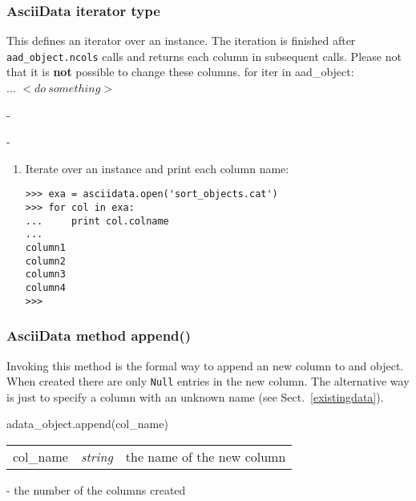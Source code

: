 \subsubsection{AsciiData iterator type}
\label{adm_iterator}
%
This defines an iterator over an \ad instance. The iteration is finished after
{\tt aad\_object.ncols} calls and returns each column in subsequent calls.
Please not that it is {\bf not} possible to change these columns.
for iter in aad\_object:\\
... $<do\ something>$

-

-

\begin{enumerate}
\item Iterate over an \ad instance and print each column name:
\begin{small}
\begin{verbatim}
>>> exa = asciidata.open('sort_objects.cat')
>>> for col in exa:
...     print col.colname
...
column1
column2
column3
column4
>>>
\end{verbatim}
\end{small}
\end{enumerate}


\subsubsection{AsciiData method append()}
\label{adm_append}
Invoking this method is the formal way to append an new column
to and \ad object. When created there are only {\tt Null} entries in the
new column. The alternative way is just to specify a column
with an unknown name (see Sect.\ \ref{existingdata}).

adata\_object.append(col\_name)

\begin{tabular}{lcl}
col\_name &{\it string}& the name of the new column\\
\end{tabular}

- the number of the columns created

